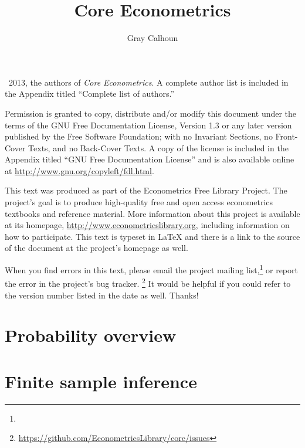 \documentclass[11pt,notitlepage]{report}
\title{Core Econometrics}
\author{Gray Calhoun}
\begin{document}
\maketitle

\bigskip\noindent%
\textcopyright\ 2013, the authors of \textit{Core Econometrics}.  A
complete author list is included in the Appendix titled ``Complete
list of authors.''

Permission is granted to copy, distribute and/or modify this document
under the terms of the GNU Free Documentation License, Version 1.3 or
any later version published by the Free Software Foundation; with no
Invariant Sections, no Front-Cover Texts, and no Back-Cover Texts.  A
copy of the license is included in the Appendix titled ``GNU Free
Documentation License'' and is also available online at
\url{http://www.gnu.org/copyleft/fdl.html}.

This text was produced as part of the Econometrics Free Library
Project.  The project's goal is to produce high-quality free and
open access econometrics textbooks and reference material.  More
information about this project is available at its homepage,
\url{http://www.econometricslibrary.org}, including information on how
to participate.  This text is typeset in LaTeX and there is a link
to the source of the document at the project's homepage as well.

\addciteinfo %

When you find errors in this text, please email the project mailing
list,\footnote{} or report
the error in the project's bug tracker.%
\footnote{\url{https://github.com/EconometricsLibrary/core/issues}}
It would be helpful if you could refer to the version number listed in
the date as well.  Thanks!

\tableofcontents
{}

\part{Probability overview}


\begin{appendices}

\end{appendices}

\part{Finite sample inference}









\begin{appendices}

\end{appendices}
\end{document}
